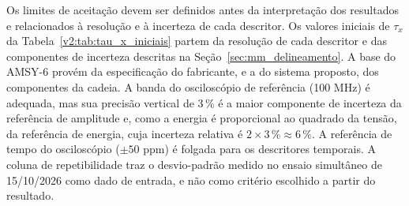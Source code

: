 Os limites de aceitação devem ser definidos antes da interpretação dos resultados e relacionados à resolução e à incerteza de cada descritor. Os valores iniciais de \(\tau_x\) da Tabela~\ref{v2:tab:tau_x_iniciais} partem da resolução de cada descritor e das componentes de incerteza descritas na Seção~\ref{sec:mm_delineamento}. A base do AMSY-6 provém da especificação do fabricante, e a do sistema proposto, dos componentes da cadeia. A banda do osciloscópio de referência (100 MHz) é adequada, mas sua precisão vertical de 3\,\% é a maior componente de incerteza da referência de amplitude e, como a energia é proporcional ao quadrado da tensão, da referência de energia, cuja incerteza relativa é \(2 \times 3\,\% \approx 6\,\%\). A referência de tempo do osciloscópio (\(\pm 50\) ppm) é folgada para os descritores temporais. A coluna de repetibilidade traz o desvio-padrão medido no ensaio simultâneo de 15/10/2026 como dado de entrada, e não como critério escolhido a partir do resultado.

